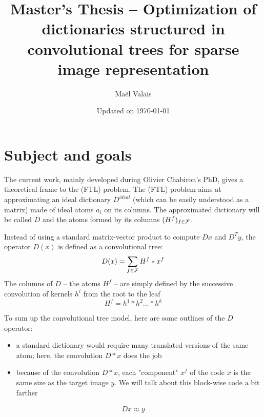 \author{Maël Valais}
\date{Updated on \today}
\title{Master's Thesis – Optimization of dictionaries structured in convolutional trees for sparse image representation}


\section{Subject and goals}

The current work, mainly developed during Olivier Chabiron's PhD, gives a theoretical frame to the (FTL) problem. The (FTL) problem aims at approximating an ideal dictionary $D^{ideal}$ (which can be easily understood as a matrix) made of ideal atoms $a_i$ on its columns. The approximated dictionary will be called $D$ and the atoms formed by its columns $(H^f)_{f \in \mathcal F}$. 

Instead of using a standard matrix-vector product to compute $Dx$ and $D^Ty$, the operator $D(x)$ is defined as a convolutional tree:
$$D(x) = \sum_{f\in\mathcal F} H^f * x^f$$
The columns of $D$ – the atoms $H^f$ – are simply defined by the successive convolution of kernels $h^i$ from the root to the leaf
$$H^f = h^1 * h^2 \dots * h^k$$

To sum up the convolutional tree model, here are some outlines of the $D$ operator:
\begin{itemize}
\item a standard dictionary would require many translated versions of the same atom; here, the convolution $D*x$ does the job 
\item because of the convolution $D*x$, each "component" $x^f$ of the code $x$ is the same size as the target image $y$. We will talk about this block-wise code a bit farther
\end{itemize}


\begin{equation*} \begin{aligned}
Dx \approx y
\end{aligned} \end{equation*}


